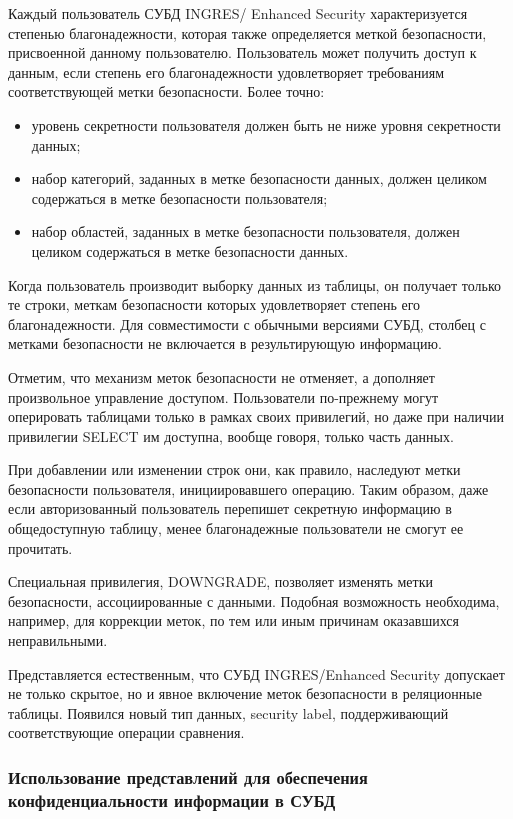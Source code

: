 Каждый пользователь СУБД INGRES/ Enhanced Security характеризуется степенью благонадежности,
которая также определяется меткой безопасности, присвоенной данному пользователю. Пользователь
может получить доступ к данным, если степень его благонадежности удовлетворяет требованиям
соответствующей метки безопасности. Более точно:
\begin{itemize}
    \item уровень секретности пользователя должен быть не ниже уровня секретности данных;
    \item набор категорий, заданных в метке безопасности данных, должен целиком содержаться в метке
        безопасности пользователя;
    \item набор областей, заданных в метке безопасности пользователя, должен целиком содержаться в
        метке безопасности данных.
\end{itemize}

Когда пользователь производит выборку данных из таблицы, он получает только те строки, меткам
безопасности которых удовлетворяет степень его благонадежности. Для совместимости с обычными
версиями СУБД, столбец с метками безопасности не включается в результирующую информацию.

Отметим, что механизм меток безопасности не отменяет, а дополняет произвольное управление доступом.
Пользователи по-прежнему могут оперировать таблицами только в рамках своих привилегий, но даже при
наличии привилегии SELECT им доступна, вообще говоря, только часть данных.

При добавлении или изменении строк они, как правило, наследуют метки безопасности пользователя,
инициировавшего операцию. Таким образом, даже если авторизованный пользователь перепишет секретную
информацию в общедоступную таблицу, менее благонадежные пользователи не смогут ее прочитать.

Специальная привилегия, DOWNGRADE, позволяет изменять метки безопасности, ассоциированные с
данными. Подобная возможность необходима, например, для коррекции меток, по тем или иным причинам
оказавшихся неправильными.

Представляется естественным, что СУБД INGRES/Enhanced Security допускает не только скрытое, но и
явное включение меток безопасности в реляционные таблицы. Появился новый тип данных, security
label, поддерживающий соответствующие операции сравнения.


\subsubsection{Использование представлений для обеспечения конфиденциальности информации в СУБД}

